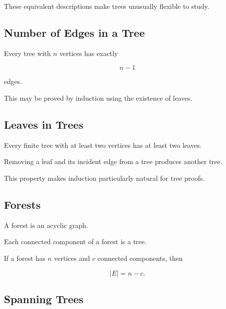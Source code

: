 These equivalent descriptions make trees unusually flexible to study.

\subsection{Number of Edges in a Tree}
\label{subsec:tree-edge-count}

\begin{theorem}
Every tree with \(n\) vertices has exactly

\[
\boxed{
n-1
}
\]

edges.
\end{theorem}

This may be proved by induction using the existence of leaves.

\subsection{Leaves in Trees}
\label{subsec:tree-leaves}

Every finite tree with at least two vertices has at least two leaves.

Removing a leaf and its incident edge from a tree produces another
tree.

This property makes induction particularly natural for tree proofs.

\subsection{Forests}
\label{subsec:forests}

A forest is an acyclic graph.

Each connected component of a forest is a tree.

If a forest has \(n\) vertices and \(c\) connected components, then

\[
\boxed{
|E|
=
n-c.
}
\]

\subsection{Spanning Trees}
\label{subsec:spanning-trees}

